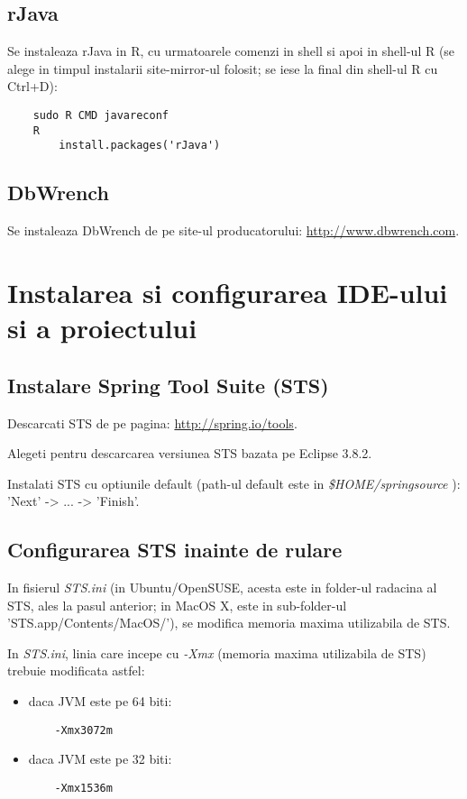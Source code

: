 \subsection{rJava}
Se instaleaza rJava in R, cu urmatoarele comenzi in shell si apoi in shell-ul R
(se alege in timpul instalarii site-mirror-ul folosit;
se iese la final din shell-ul R cu Ctrl+D):
\begin{lstlisting}
	sudo R CMD javareconf
	R
		install.packages('rJava')
\end{lstlisting}

\subsection{DbWrench}
Se instaleaza DbWrench de pe site-ul producatorului:
\url{http://www.dbwrench.com}.

\section{Instalarea si configurarea IDE-ului si a proiectului}

\subsection{Instalare Spring Tool Suite (STS)}
Descarcati STS de pe pagina:
\url{http://spring.io/tools}.

Alegeti pentru descarcarea versiunea STS bazata pe Eclipse 3.8.2.

Instalati STS cu optiunile default (path-ul default este in \emph{\$HOME/springsource} ):
'Next' -> ... -> 'Finish'.

\subsection{Configurarea STS inainte de rulare}
In fisierul \emph{STS.ini} (in Ubuntu/OpenSUSE, acesta este in folder-ul
radacina al STS, ales la pasul anterior; in MacOS X, este in sub-folder-ul
'STS.app/Contents/MacOS/'), se modifica memoria maxima utilizabila de STS.

In \emph{STS.ini}, linia care incepe cu \emph{-Xmx} 
(memoria maxima utilizabila de STS) 
trebuie modificata astfel:
\begin{itemize} 
\item daca JVM este pe 64 biti:
\begin{lstlisting}
	-Xmx3072m
\end{lstlisting}
\item daca JVM este pe 32 biti:
\begin{lstlisting}
	-Xmx1536m
\end{lstlisting}
\end{itemize}

